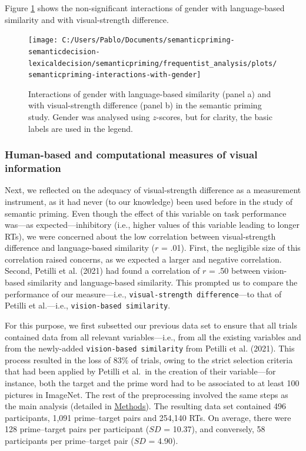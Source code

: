 \documentclass[
  12pt,
  man,floatsintext]{apa7}
\begin{document}
Figure \ref{fig:semanticpriming-interactions-with-gender} shows the non-significant interactions of gender with language-based similarity and with visual-strength difference.

\begin{figure}

{\centering \texttt{[image: C:/Users/Pablo/Documents/semanticpriming-semanticdecision-lexicaldecision/semanticpriming/frequentist\_analysis/plots/semanticpriming-interactions-with-gender]} 

}

\caption{Interactions of gender with language-based similarity (panel a) and with visual-strength difference (panel b) in the semantic priming study. Gender was analysed using $z$-scores, but for clarity, the basic labels are used in the legend.}\label{fig:semanticpriming-interactions-with-gender}
\end{figure}

\hypertarget{results-human-based-and-computational-measures-of-visual-information}{%
\subsubsection{Human-based and computational measures of visual information}\label{results-human-based-and-computational-measures-of-visual-information}}

Next, we reflected on the adequacy of visual-strength difference as a measurement instrument, as it had never (to our knowledge) been used before in the study of semantic priming. Even though the effect of this variable on task performance was---as expected---inhibitory (i.e., higher values of this variable leading to longer RTs), we were concerned about the low correlation between visual-strength difference and language-based similarity (\(r\) = .01). First, the negligible size of this correlation raised concerns, as we expected a larger and negative correlation. Second, Petilli et al. (2021) had found a correlation of \(r\) = .50 between vision-based similarity and language-based similarity. This prompted us to compare the performance of our measure---i.e., \texttt{visual-strength\ difference}---to that of Petilli et al.---i.e., \texttt{vision-based\ similarity}.

For this purpose, we first subsetted our previous data set to ensure that all trials contained data from all relevant variables---i.e., from all the existing variables and from the newly-added \texttt{vision-based\ similarity} from Petilli et al. (2021). This process resulted in the loss of 83\% of trials, owing to the strict selection criteria that had been applied by Petilli et al.~in the creation of their variable---for instance, both the target and the prime word had to be associated to at least 100 pictures in ImageNet. The rest of the preprocessing involved the same steps as the main analysis (detailed in \protect\hyperlink{semanticpriming-dataset}{\underline{Methods}}). The resulting data set contained 496 participants, 1,091 prime--target pairs and 254,140 RTs. On average, there were 128 prime--target pairs per participant (\(SD\) = 10.37), and conversely, 58 participants per prime--target pair (\(SD\) = 4.90).
\end{document}
